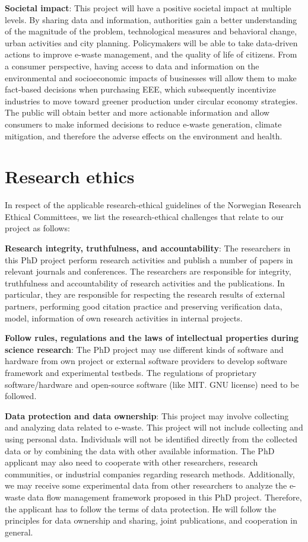 \documentclass{article}
\numberwithin{equation}{section}
\begin{document}
\textbf{Societal impact}: This project will have a positive societal impact at multiple levels. By sharing data and information, authorities gain a better understanding of the magnitude of the problem, technological measures and behavioral change, urban activities and city planning. Policymakers will be able to take data-driven actions to improve e-waste management, and the quality of life of citizens. From a consumer perspective, having access to data and information on the environmental and socioeconomic impacts of businesses will allow them to make fact-based decisions when purchasing EEE, which subsequently incentivize industries to move toward greener production under circular economy strategies. The public will obtain better and more actionable information and allow consumers to make informed decisions to reduce e-waste generation, climate mitigation, and therefore the adverse effects on the environment and health.

\section{Research ethics}
In respect of the applicable research-ethical guidelines of the Norwegian Research Ethical Committees, we list the research-ethical challenges that relate to our project as follows:

\textbf{Research integrity, truthfulness, and accountability}: The researchers in this PhD project perform research activities and publish a number of papers in relevant journals and conferences. The researchers are responsible for integrity, truthfulness and accountability of research activities and the publications. In particular, they are responsible for respecting the research results of external partners, performing good citation practice and preserving verification data, model, information of own research activities in internal projects.

\textbf{Follow rules, regulations and the laws of intellectual properties during science research}: The PhD project may use different kinds of software and hardware from own project or external software providers to develop software framework and experimental testbeds. The regulations of proprietary software/hardware and open-source software (like MIT. GNU license) need to be followed.

\textbf{Data protection and data ownership}: This project may involve collecting and analyzing data related to e-waste. This project will not include collecting and using personal data. Individuals will not be identified directly from the collected data or by combining the data with other available information. The PhD applicant may also need to cooperate with other researchers, research communities, or industrial companies regarding research methods. Additionally, we may receive some experimental data from other researchers to analyze the e-waste data flow management framework proposed in this PhD project. Therefore, the applicant has to follow the terms of data protection. He will follow the principles for data ownership and sharing, joint publications, and cooperation in general.
\end{document}

